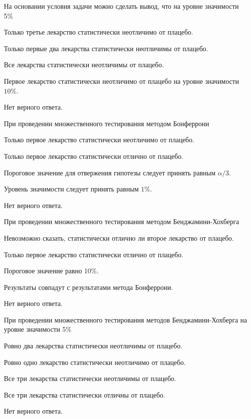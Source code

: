 \documentclass[10pt, a4paper]{exam}
\begin{document}
	\begin{questions}
		\question На основании условия задачи можно сделать вывод, что на уровне значимости 5\%
		\begin{choices}
			\item Только третье лекарство статистически неотличимо от плацебо.
			\item Только первые два лекарства статистически неотличимы от плацебо.
			\item Все лекарства статистически неотличимы от плацебо.
			\item Первое лекарство статистически неотличимо от плацебо на уровне значимости $10\%$.
			\item Нет верного ответа.
		\end{choices}
	
		\question При проведении множественного тестирования методом Бонферрони
		\begin{choices}
			\item Только первое лекарство статистически неотличимо от плацебо.
			\item Только первое лекарство статистически отлично от плацебо.
			\item Пороговое значение для отвержения гипотезы следует принять равным $\alpha / 3$.
			\item Уровень значимости следует принять равным $1\%$.
			\item Нет верного ответа.
		\end{choices}
	
		\question При проведении множественного тестирования методом Бенджамини-Хохберга
		\begin{choices}
			\item Невозможно сказать, статистически отлично ли второе лекарство от плацебо.
			\item Только первое лекарство статистически отлично от плацебо.
			\item Пороговое значение равно 10\%.
			\item Результаты совпадут с результатами метода Бонферрони.
			\item Нет верного ответа.
		\end{choices}
	
		\question При проведении множественного тестирования методов Бенджамини-Хохберга на уровне значимости 5\%
		\begin{choices}
			\item Ровно два лекарства статистически неотличимы от плацебо.
			\item Ровно одно лекарство статистически неотличимо от плацебо.
			\item Все три лекарства статистически неотличимы от плацебо.
			\item Все три лекарства статистически отличны от плацебо.
			\item Нет верного ответа.
		\end{choices}
	\end{questions}
	
\end{document}
